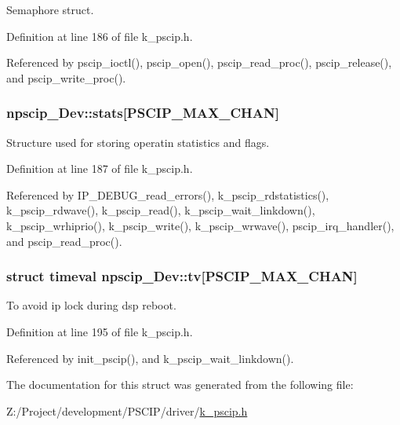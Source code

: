 Semaphore struct. 



Definition at line 186 of file k\_\-pscip.h.

Referenced by pscip\_\-ioctl(), pscip\_\-open(), pscip\_\-read\_\-proc(), pscip\_\-release(), and pscip\_\-write\_\-proc().\hypertarget{structnpscip___dev_ac9020cb6a85822da71cb6a10c06d36f}{
\subsubsection[{stats}]{ {\bf npscip\_\-Dev::stats}\mbox{[}PSCIP\_\-MAX\_\-CHAN\mbox{]}}}
\label{structnpscip___dev_ac9020cb6a85822da71cb6a10c06d36f}


Structure used for storing operatin statistics and flags. 



Definition at line 187 of file k\_\-pscip.h.

Referenced by IP\_\-DEBUG\_\-read\_\-errors(), k\_\-pscip\_\-rdstatistics(), k\_\-pscip\_\-rdwave(), k\_\-pscip\_\-read(), k\_\-pscip\_\-wait\_\-linkdown(), k\_\-pscip\_\-wrhiprio(), k\_\-pscip\_\-write(), k\_\-pscip\_\-wrwave(), pscip\_\-irq\_\-handler(), and pscip\_\-read\_\-proc().\hypertarget{structnpscip___dev_30bb89cf1d7aed16f8ebacc55f6ded2e}{
\subsubsection[{tv}]{\setlength{\rightskip}{0pt plus 5cm}struct timeval {\bf npscip\_\-Dev::tv}\mbox{[}PSCIP\_\-MAX\_\-CHAN\mbox{]}}}
\label{structnpscip___dev_30bb89cf1d7aed16f8ebacc55f6ded2e}


To avoid ip lock during dsp reboot. 



Definition at line 195 of file k\_\-pscip.h.

Referenced by init\_\-pscip(), and k\_\-pscip\_\-wait\_\-linkdown().

The documentation for this struct was generated from the following file:\begin{CompactItemize}
\item 
Z:/Project/development/PSCIP/driver/\hyperlink{k__pscip_8h}{k\_\-pscip.h}\end{CompactItemize}

